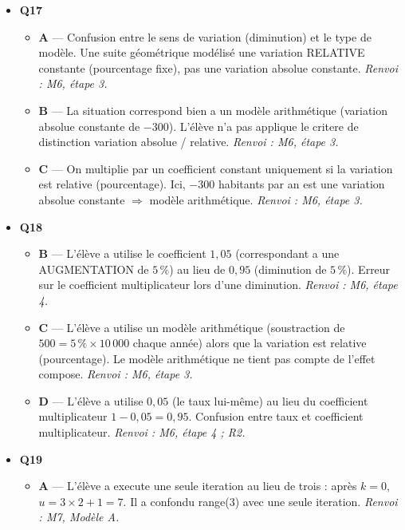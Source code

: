 \begin{itemize}
\begin{itemize}
    \item \textbf{D} — L'élève a utilise le taux en pourcentage ($4$) directement comme coefficient multiplicateur. Un coefficient $q = 4$ signifierait quadrupler le capital chaque année. \emph{Renvoi : M6, étape 4 ; R2.}
  \end{itemize}
  \item \textbf{Q17}
  \begin{itemize}
    \item \textbf{A} — Confusion entre le sens de variation (diminution) et le type de modèle. Une suite géométrique modélisé une variation RELATIVE constante (pourcentage fixe), pas une variation absolue constante. \emph{Renvoi : M6, étape 3.}
    \item \textbf{B} — La situation correspond bien a un modèle arithmétique (variation absolue constante de $-300$). L'élève n'a pas applique le critere de distinction variation absolue / relative. \emph{Renvoi : M6, étape 3.}
    \item \textbf{C} — On multiplie par un coefficient constant uniquement si la variation est relative (pourcentage). Ici, $-300$ habitants par an est une variation absolue constante $\Rightarrow$ modèle arithmétique. \emph{Renvoi : M6, étape 3.}
  \end{itemize}
  \item \textbf{Q18}
  \begin{itemize}
    \item \textbf{B} — L'élève a utilise le coefficient $1{,}05$ (correspondant a une AUGMENTATION de $5\,\%$) au lieu de $0{,}95$ (diminution de $5\,\%$). Erreur sur le coefficient multiplicateur lors d'une diminution. \emph{Renvoi : M6, étape 4.}
    \item \textbf{C} — L'élève a utilise un modèle arithmétique (soustraction de $500 = 5\,\% \times 10\,000$ chaque année) alors que la variation est relative (pourcentage). Le modèle arithmétique ne tient pas compte de l'effet compose. \emph{Renvoi : M6, étape 3.}
    \item \textbf{D} — L'élève a utilise $0{,}05$ (le taux lui-même) au lieu du coefficient multiplicateur $1 - 0{,}05 = 0{,}95$. Confusion entre taux et coefficient multiplicateur. \emph{Renvoi : M6, étape 4 ; R2.}
  \end{itemize}
  \item \textbf{Q19}
  \begin{itemize}
    \item \textbf{A} — L'élève a execute une seule iteration au lieu de trois : après $k = 0$, $u = 3 \times 2 + 1 = 7$. Il a confondu range(3) avec une seule iteration. \emph{Renvoi : M7, Modèle A.}

\end{itemize}
\end{itemize}
